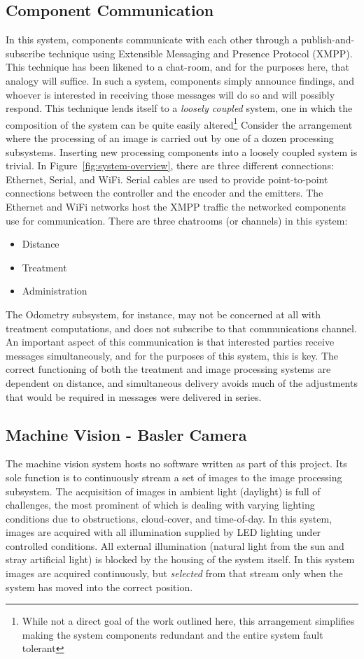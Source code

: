\documentclass[letterpaper]{article}
\begin{document}
{{\subsection{Component Communication} 
In this system, components communicate with each other through a publish-and-subscribe technique using Extensible Messaging and Presence Protocol (XMPP). This technique has been likened to a chat-room, and for the purposes here, that analogy will suffice. In such a system, components simply announce findings, and whoever is interested in receiving those messages will do so and will possibly respond. This technique lends itself to a \textit{loosely coupled} system, one in which the composition of the system can be quite easily altered\footnote{While not a direct goal of the work outlined here, this arrangement simplifies making the system components redundant and the entire system fault tolerant} Consider the arrangement where the processing of an image is carried out by one of a dozen processing subsystems. Inserting new processing components into a loosely coupled system is trivial.
In Figure~\ref{fig:system-overview}, there are three different connections: Ethernet, Serial, and WiFi. Serial cables are used to provide point-to-point connections between the controller and the encoder and the emitters. The Ethernet and WiFi networks host the XMPP traffic the networked components use for communication. There are three chatrooms (or channels) in this system:
\begin{itemize}
	\item{Distance}
	\item{Treatment}
	\item{Administration}
\end{itemize}
The Odometry subsystem, for instance, may not be concerned at all with treatment computations, and does not subscribe to that communications channel. An important aspect of this communication is that interested parties receive messages simultaneously, and for the purposes of this system, this is key. The correct functioning of both the treatment and image processing systems are dependent on distance, and simultaneous delivery avoids much of the adjustments that would be required in messages were delivered in series.

\subsection{Machine Vision - Basler Camera}
The machine vision system hosts no software written as part of this project.  Its sole function is to continuously stream a set of images to the image processing subsystem\cite{noauthor_undated-tt}.  The acquisition of images in ambient light (daylight) is full of challenges, the most prominent of which is dealing with varying lighting conditions due to obstructions, cloud-cover, and time-of-day. In this system, images are acquired with all illumination supplied by LED lighting under controlled conditions. All external illumination (natural light from the sun and stray artificial light) is blocked by the housing of the system itself. In this system images are acquired continuously, but \textit{selected} from that stream only when the system has moved into the correct position.

}}
\end{document}
